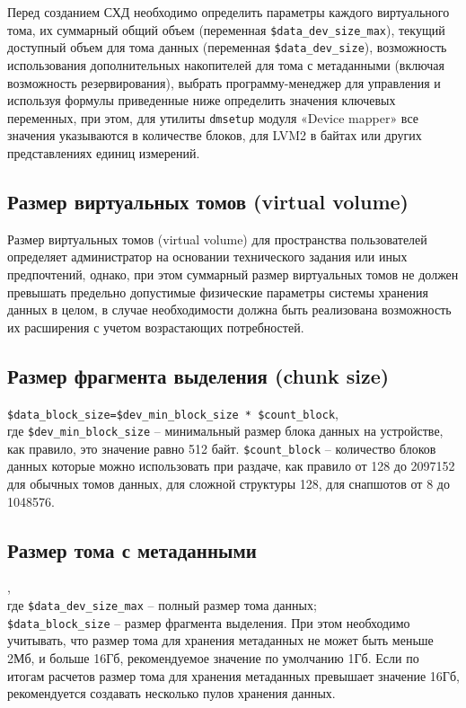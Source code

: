 \documentclass[10pt, a5paper]{article}
\begin{document}
Перед созданием СХД необходимо определить  параметры каждого виртуального тома, их суммарный общий объем (переменная \verb!$data_dev_size_max!), текущий доступный объем  для тома данных (переменная \verb!$data_dev_size!), возможность использования дополнительных накопителей для тома с метаданными (включая возможность резервирования), выбрать программу-менеджер для управления и используя формулы приведенные ниже определить значения ключевых переменных, при этом, для утилиты \verb!dmsetup! модуля «Device mapper» все значения указываются в количестве блоков, для LVM2 в байтах или других представлениях единиц измерений.

\subsection*{Размер виртуальных томов (virtual volume)}

Размер виртуальных томов (virtual volume) для пространства пользователей определяет администратор на основании технического задания или иных предпочтений, однако, при этом суммарный размер виртуальных томов не должен превышать предельно допустимые физические параметры системы  хранения данных в целом, в случае необходимости  должна быть реализована возможность их расширения с учетом возрастающих потребностей.

\subsection*{Размер фрагмента выделения (chunk size)}

\verb!$data_block_size=$dev_min_block_size * $count_block!, \\ где
\verb!$dev_min_block_size! – минимальный размер блока данных на устройстве, как правило, это значение равно 512 байт.
\verb!$count_block! – количество блоков данных которые можно использовать при раздаче, как правило от 128 до 2097152 для обычных томов данных, для сложной структуры 128, для снапшотов от 8 до 1048576.

\subsection*{Размер тома с метаданными}

, \\где
\verb!$data_dev_size_max!  –  полный размер тома данных;\\
\verb!$data_block_size! – размер фрагмента выделения. 
При этом необходимо учитывать, что размер тома для хранения метаданных не может быть меньше 2Мб, и больше 16Гб, рекомендуемое значение по умолчанию 1Гб. Если по итогам расчетов размер тома для хранения метаданных превышает значение 16Гб, рекомендуется создавать несколько пулов хранения данных.
\end{document}

